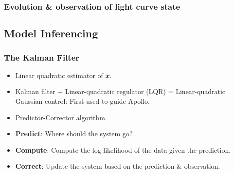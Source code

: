 \documentclass[hyperref={pdfpagelabels=false}]{beamer}
\begin{document}
\begin{frame}
\frametitle{Evolution \& observation of light curve state}
  \begin{center}
    \centering
  \end{center}
\end{frame}

\subsection{Model Inferencing}

\begin{frame}
\frametitle{The Kalman Filter}
  \begin{itemize}
    \item Linear quadratic estimator of $\mathbfit{x}$.
    \item Kalman filter + Linear-quadratic regulator (LQR) = Linear-quadratic Gaussian control: First used to guide Apollo.
    \item Predictor-Corrector algorithm.
    \item \textbf{Predict}: Where should the system go?
    \item \textbf{Compute}: Compute the log-likelihood of the data given the prediction.
    \item \textbf{Correct}: Update the system based on the prediction \& observation.
  \end{itemize}
\end{frame}
\end{document}
